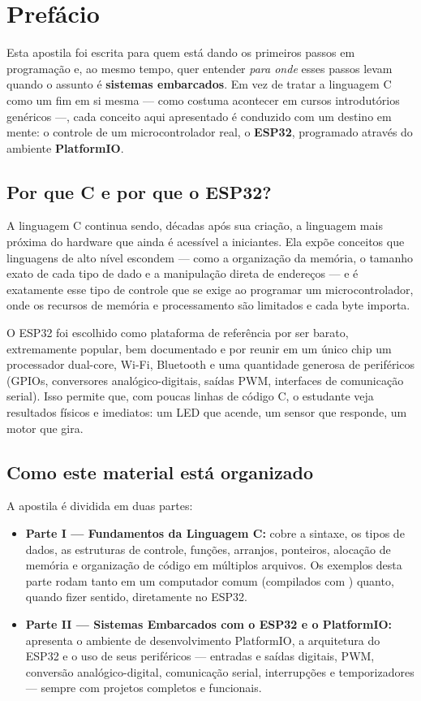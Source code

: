 \chapter*{Prefácio}

Esta apostila foi escrita para quem está dando os primeiros passos em programação e, ao mesmo tempo, quer entender \emph{para onde} esses passos levam quando o assunto é \textbf{sistemas embarcados}. Em vez de tratar a linguagem C como um fim em si mesma — como costuma acontecer em cursos introdutórios genéricos —, cada conceito aqui apresentado é conduzido com um destino em mente: o controle de um microcontrolador real, o \textbf{ESP32}, programado através do ambiente \textbf{PlatformIO}.

\section*{Por que C e por que o ESP32?}

A linguagem C continua sendo, décadas após sua criação, a linguagem mais próxima do hardware que ainda é acessível a iniciantes. Ela expõe conceitos que linguagens de alto nível escondem — como a organização da memória, o tamanho exato de cada tipo de dado e a manipulação direta de endereços — e é exatamente esse tipo de controle que se exige ao programar um microcontrolador, onde os recursos de memória e processamento são limitados e cada byte importa.

O ESP32 foi escolhido como plataforma de referência por ser barato, extremamente popular, bem documentado e por reunir em um único chip um processador dual-core, Wi-Fi, Bluetooth e uma quantidade generosa de periféricos (GPIOs, conversores analógico-digitais, saídas PWM, interfaces de comunicação serial). Isso permite que, com poucas linhas de código C, o estudante veja resultados físicos e imediatos: um LED que acende, um sensor que responde, um motor que gira.

\section*{Como este material está organizado}

A apostila é dividida em duas partes:

\begin{itemize}
    \item \textbf{Parte I — Fundamentos da Linguagem C:} cobre a sintaxe, os tipos de dados, as estruturas de controle, funções, arranjos, ponteiros, alocação de memória e organização de código em múltiplos arquivos. Os exemplos desta parte rodam tanto em um computador comum (compilados com ) quanto, quando fizer sentido, diretamente no ESP32.
    \item \textbf{Parte II — Sistemas Embarcados com o ESP32 e o PlatformIO:} apresenta o ambiente de desenvolvimento PlatformIO, a arquitetura do ESP32 e o uso de seus periféricos — entradas e saídas digitais, PWM, conversão analógico-digital, comunicação serial, interrupções e temporizadores — sempre com projetos completos e funcionais.
\end{itemize}

